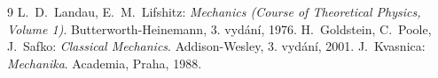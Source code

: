 \begin{thebibliography}{9}
    L.~D.~Landau, E.~M.~Lifshitz:
    \emph{Mechanics (Course of Theoretical Physics, Volume 1)}.
    Butterworth-Heinemann, 3. vydání, 1976.
    H.~Goldstein, C.~Poole, J.~Safko:
    \emph{Classical Mechanics}.
    Addison-Wesley, 3. vydání, 2001.
    J.~Kvasnica:
    \emph{Mechanika}.
    Academia, Praha, 1988.
\end{thebibliography}
